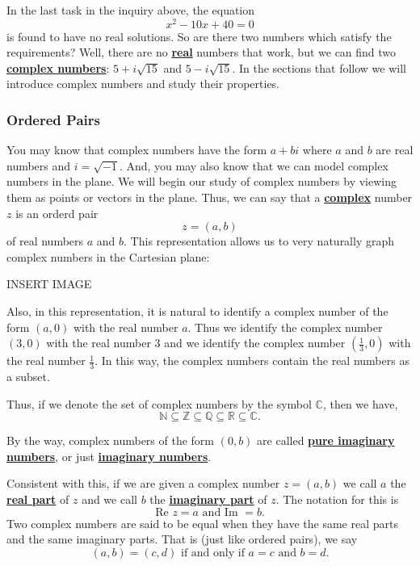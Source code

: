 \documentclass[11pt]{article}
\renewcommand\emph[1]{\underline{\bf{#1}}} %
\theoremstyle{definition}
\begin{document}
In the last task in the inquiry above, the equation
\[ x^2 - 10x + 40 = 0\]
is found to have no real solutions. So are there two numbers which satisfy the requirements?  Well, there are no \emph{real} numbers that work, but
we can find two \emph{complex numbers}: $5 + i\sqrt{15}$ and $5-i\sqrt{15}$. In the sections that follow we will introduce complex numbers and study their 
properties.

\subsubsection{Ordered Pairs}

You may know that complex numbers have the form $a + bi$ where $a$ and $b$ are real numbers and $i = \sqrt{-1}$. And, you may also know that we can model 
complex numbers in the plane. We will begin our study of complex numbers by viewing them as points or vectors in the plane. Thus, we can say that a 
\emph{complex} number $z$ is an orderd pair
\[ z = (a,b)\]
of real numbers $a$ and $b$. This representation allows us to very naturally graph complex numbers in the Cartesian plane:

\begin{center}
  INSERT IMAGE
\end{center}

Also, in this representation, it is natural to identify a complex number of the form $(a,0)$ with the real number $a$. Thus we identify the complex number
$(3,0)$ with the real number 3 and we identify the complex number $\left( \frac{1}{3},0 \right)$ with the real number $\frac{1}{3}$. In this way, 
the complex numbers contain the real numbers as a subset. 

Thus, if we denote the set of complex numbers by the symbol $\mathbb{C}$, then we have,
\[ \mathbb{N} \subseteq \mathbb{Z} \subseteq \mathbb{Q} \subseteq \mathbb{R} \subseteq \mathbb{C}.\]

By the way, complex numbers of the form $(0,b)$ are called \emph{pure imaginary numbers}, or just \emph{imaginary numbers}.

Consistent with this, if we are given a complex number $z=(a,b)$ we call $a$ the \emph{real part} of $z$ and we call $b$ the \emph{imaginary part} of $z$. The 
notation for this is 
\[ \text{Re }z = a \text{ and } \text{Im }=b.\]
Two complex numbers are said to be equal when they have the same real parts and the same imaginary parts. That is (just like ordered pairs), we say
\[ (a,b) = (c,d) \text{ if and only if } a=c \text{ and } b=d. \]
\end{document}
